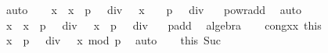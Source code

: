 \begin{isabellebody}
\ auto\isanewline
\ \ \isamarkupfalse%
\ {\isachardoublequoteopen}x\ {\isacharasterisk}{\kern0pt}\ x\ {\isacharcircum}{\kern0pt}\ {\isacharparenleft}{\kern0pt}{\isacharparenleft}{\kern0pt}p\ {\isacharminus}{\kern0pt}\ {}{\isacharparenright}{\kern0pt}\ div\ {}{\isacharparenright}{\kern0pt}\ {\isacharequal}{\kern0pt}\ x\ {\isacharcircum}{\kern0pt}\ {\isacharparenleft}{\kern0pt}{}\ {\isacharplus}{\kern0pt}\ {\isacharparenleft}{\kern0pt}p\ {\isacharminus}{\kern0pt}\ {}{\isacharparenright}{\kern0pt}\ div\ {}{\isacharparenright}{\kern0pt}{\isachardoublequoteclose}\ \isamarkupfalse%
\ powr{\isacharunderscore}{\kern0pt}add\ \isamarkupfalse%
\ auto\isanewline
\ \ \isamarkupfalse%
\ \isamarkupfalse%
\ {\isachardoublequoteopen}x\ {\isacharasterisk}{\kern0pt}\ x\ {\isacharcircum}{\kern0pt}\ {\isacharparenleft}{\kern0pt}{\isacharparenleft}{\kern0pt}p\ {\isacharminus}{\kern0pt}\ {}{\isacharparenright}{\kern0pt}\ div\ {}{\isacharparenright}{\kern0pt}\ {\isacharequal}{\kern0pt}\ x\ {\isacharcircum}{\kern0pt}\ {\isacharparenleft}{\kern0pt}{\isacharparenleft}{\kern0pt}p\ {\isacharplus}{\kern0pt}\ {}{\isacharparenright}{\kern0pt}\ div\ {}{\isacharparenright}{\kern0pt}{\isachardoublequoteclose}\ \isamarkupfalse%
\ p{\isacharunderscore}{\kern0pt}add{\isacharunderscore}{\kern0pt}{}\ \isamarkupfalse%
\ algebra\isanewline
\ \ \isamarkupfalse%
\ cong{\isacharunderscore}{\kern0pt}xx\ this\ \isamarkupfalse%
\ {\isachardoublequoteopen}{\isacharbrackleft}{\kern0pt}x\ {\isacharcircum}{\kern0pt}\ {\isacharparenleft}{\kern0pt}{\isacharparenleft}{\kern0pt}p\ {\isacharplus}{\kern0pt}\ {}{\isacharparenright}{\kern0pt}\ div\ {}{\isacharparenright}{\kern0pt}\ {\isacharequal}{\kern0pt}\ x{\isacharbrackright}{\kern0pt}\ {\isacharparenleft}{\kern0pt}mod\ p{\isacharparenright}{\kern0pt}{\isachardoublequoteclose}\ \isamarkupfalse%
\ auto\isanewline
\isanewline
\ \ \isamarkupfalse%
\ this\ Suc\ \isamarkupfalse%

\end{isabellebody}
